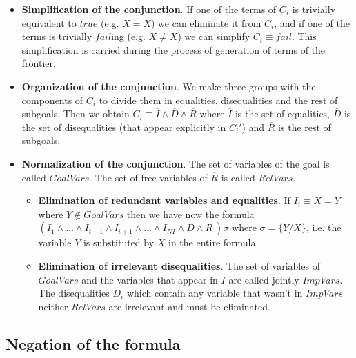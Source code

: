 \documentclass{llncs}
\begin{document}
\begin{itemize}

\item {\bf Simplification of the conjunction}. If one of the terms of
$C_i$ is trivially equivalent to 
$true$ (e.g. $X=X$) we can eliminate it from $C_i$, and if
one of the terms is trivially $fail$ing (e.g. $X \neq X$) we can simplify $C_i
\equiv fail$. This simplification is carried during the process
of generation of terms of the frontier.

\item {\bf Organization of the conjunction}. We make three groups with
the components of $C_i$ to divide them in equalities, disequalities
and the rest of subgoals. Then we obtain $C_i \equiv \overline{I}
\wedge \overline{D} \wedge \overline{R}$ where $\overline{I}$ is the
set of equalities, $\overline{D}$ is the set of disequalities (that
appear explicitly in $C_i'$) and $\overline{R}$ is the rest of subgoals.
  
\item {\bf Normalization of the conjunction}. The set of variables of the
goal is called $GoalVars$. The set of free variables of $\overline{R}$
is called $RelVars$.

    \begin{itemize}


       \item {\bf Elimination of redundant variables and
       equalities}. If $I_i \equiv X = Y$ where $Y \not\in GoalVars$
       then we have now the formula $ ( I_1 \wedge \ldots \wedge
       I_{i-1} \wedge I_{i+1} \wedge \ldots \wedge I_{NI} \wedge
       \overline{D} \wedge \overline{R}~) \sigma $ where $ \sigma = \{
       Y / X \}$, i.e. the variable $Y$ is substituted by $X$ in the
       entire formula. 
       \item {\bf Elimination of irrelevant disequalities}. The set of
       variables of $GoalVars$ and the variables that appear in
       $\overline{I}$ are called jointly $ImpVars$. The disequalities
       $D_i$ which contain any variable that wasn't in $ImpVars$
       neither $RelVars$ are irrelevant and must be eliminated.

    \end{itemize}

 \end{itemize}

 


\subsection{Negation of the formula}
\label{negation}
\end{document}
